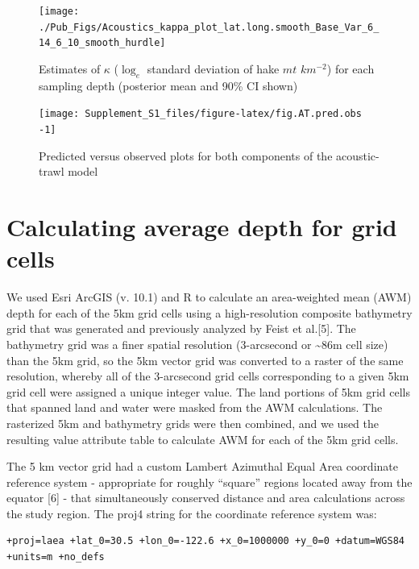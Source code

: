 \documentclass[
]{article}
\begin{document}
\begin{figure}
\texttt{[image: ./Pub\_Figs/Acoustics\_kappa\_plot\_lat.long.smooth\_Base\_Var\_6\_14\_6\_10\_smooth\_hurdle]} \caption{\label{fig:AT.kappa} Estimates of \(\kappa\) (\(\log_e\) standard deviation of hake \(mt\) \(km^{-2}\)) for each sampling depth (posterior mean and 90\% CI shown)}\label{fig:fig.AT.kappa}
\end{figure}

\begin{figure}
\texttt{[image: Supplement\_S1\_files/figure-latex/fig.AT.pred.obs -1]} \caption{\label{fig:AT.pred.obs} Predicted versus observed plots for both components of the acoustic-trawl model}\label{fig:fig.AT.pred.obs }
\end{figure}

\newpage
\clearpage

\hypertarget{coordinate-reference-system}{%
\section{Calculating average depth for grid cells}\label{coordinate-reference-system}}

We used Esri ArcGIS (v. 10.1) and R to calculate an area-weighted mean
(AWM) depth for each of the 5km grid cells using a high-resolution
composite bathymetry grid that was generated and previously analyzed by
Feist et al.{[}5{]}. The bathymetry grid was a finer spatial resolution
(3-arcsecond or \textasciitilde86m cell size) than the 5km grid, so the
5km vector grid was converted to a raster of the same resolution,
whereby all of the 3-arcsecond grid cells corresponding to a given 5km
grid cell were assigned a unique integer value. The land portions of 5km
grid cells that spanned land and water were masked from the AWM
calculations. The rasterized 5km and bathymetry grids were then
combined, and we used the resulting value attribute table to calculate
AWM for each of the 5km grid cells.

The 5 km vector grid had a custom Lambert Azimuthal Equal Area
coordinate reference system - appropriate for roughly ``square'' regions
located away from the equator {[}6{]} - that simultaneously conserved
distance and area calculations across the study region. The proj4 string
for the coordinate reference system was:

\begin{verbatim}
+proj=laea +lat_0=30.5 +lon_0=-122.6 +x_0=1000000 +y_0=0 +datum=WGS84 +units=m +no_defs
\end{verbatim}
\end{document}
